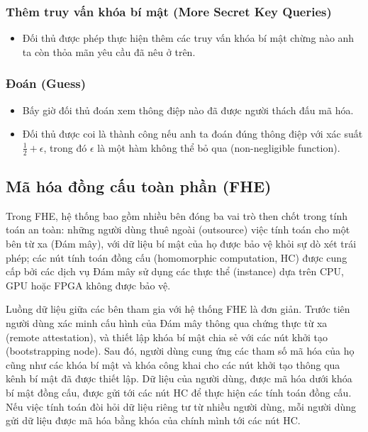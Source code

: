 \subsubsection*{Thêm truy vấn khóa bí mật (More Secret Key Queries)}
\begin{itemize}
  \item Đối thủ được phép thực hiện thêm các truy vấn khóa bí mật chừng nào anh ta còn thỏa mãn yêu cầu đã nêu ở trên.
\end{itemize}

\subsubsection*{Đoán (Guess)}
\begin{itemize}
  \item Bấy giờ đối thủ đoán xem thông điệp nào đã được người thách đấu mã hóa.
  \item Đối thủ được coi là thành công nếu anh ta đoán đúng thông điệp với xác suất $\frac{1}{2} + \epsilon$, trong đó $\epsilon$ là một hàm không thể bỏ qua (non-negligible function).
\end{itemize}

\subsection{Mã hóa đồng cấu toàn phần (FHE)}

Trong FHE, hệ thống bao gồm nhiều bên đóng ba vai trò then chốt trong tính toán an toàn: những người dùng thuê ngoài (outsource) việc tính toán cho một bên từ xa (Đám mây), với dữ liệu bí mật của họ được bảo vệ khỏi sự dò xét trái phép; các nút tính toán đồng cấu (homomorphic computation, HC) được cung cấp bởi các dịch vụ Đám mây sử dụng các thực thể (instance) dựa trên CPU, GPU hoặc FPGA không được bảo vệ.

Luồng dữ liệu giữa các bên tham gia với hệ thống FHE là đơn giản. Trước tiên người dùng xác minh cấu hình của Đám mây thông qua chứng thực từ xa (remote attestation), và thiết lập khóa bí mật chia sẻ với các nút khởi tạo (bootstrapping node). Sau đó, người dùng cung ứng các tham số mã hóa của họ cũng như các khóa bí mật và khóa công khai cho các nút khởi tạo thông qua kênh bí mật đã được thiết lập. Dữ liệu của người dùng, được mã hóa dưới khóa bí mật đồng cấu, được gửi tới các nút HC để thực hiện các tính toán đồng cấu. Nếu việc tính toán đòi hỏi dữ liệu riêng tư từ nhiều người dùng, mỗi người dùng gửi dữ liệu được mã hóa bằng khóa của chính mình tới các nút HC.


